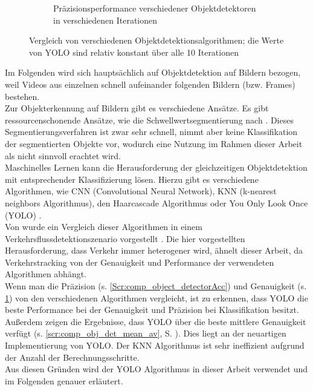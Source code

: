 \begin{figure}[ht]
\begin{subfigure}[b]{0.45\textwidth}
		\caption{Präzisionsperformance verschiedener Objektdetektoren in verschiedenen Iterationen  \cite{Pavani2022}}
		\label{Scr:comp_object_detectorPrec}
	\end{subfigure} 
	\caption[Vergleich von verschiedenen Objektdetektionsalgorithmen]{Vergleich von verschiedenen Objektdetektionsalgorithmen; die Werte von YOLO sind relativ konstant über alle 10 Iterationen \cite{Pavani2022}}
	\label{Scr:comp_object_detector}
\end{figure}
{Im Folgenden wird sich hauptsächlich auf Objektdetektion auf Bildern bezogen, weil Videos aus einzelnen schnell aufeinander folgenden Bildern (bzw. Frames) bestehen. \\
Zur Objekterkennung auf Bildern gibt es verschiedene Ansätze. Es gibt ressourcenschonende Ansätze, wie die Schwellwertsegmentierung nach \citeauthor{Otsu1979} \cite{Otsu1979}. Dieses Segmentierungsverfahren ist zwar sehr schnell, nimmt aber keine Klassifikation der segmentierten Objekte vor, wodurch eine Nutzung im Rahmen dieser Arbeit als nicht sinnvoll erachtet wird. \\
Maschinelles Lernen kann die Herausforderung der gleichzeitigen Objektdetektion mit entsprechender Klassifizierung lösen. Hierzu gibt es verschiedene Algorithmen, wie CNN (\glqq Convolutional Neural Network\grqq{}), KNN (\glqq k-nearest neighbors\grqq{} Algorithmus), den Haarcascade Algorithmus oder \glqq You Only Look Once\grqq{} (YOLO) 
\cite{Pavani2022}. \\
Von \citeauthor{Pavani2022} \cite{Pavani2022} wurde ein Vergleich dieser Algorithmen in einem  Verkehrsflussdetektionszenario vorgestellt \citep{Pavani2022}. Die hier vorgestellten Herausforderung, dass Verkehr immer heterogener wird, ähnelt dieser Arbeit, da Verkehrstracking von der Genauigkeit und Performance der verwendeten Algorithmen abhängt.\\
Wenn man die Präzision (s. \ref{Scr:comp_object_detectorAcc}) und Genauigkeit (s. \ref{Scr:comp_object_detectorPrec}) von den verschiedenen Algorithmen vergleicht, ist zu erkennen, dass YOLO die beste Performance bei der Genauigkeit und Präzision bei Klassifikation besitzt. Außerdem zeigen die Ergebnisse, dass YOLO über die beste mittlere Genauigkeit verfügt (s. \ref{scr:comp_obj_det_mean_av}, S. \pageref{scr:comp_obj_det_mean_av}). Dies liegt an der neuartigen Implementierung von YOLO. Der KNN Algorithmus ist sehr ineffizient aufgrund der Anzahl der Berechnungsschritte.\\
Aus diesen Gründen wird der YOLO Algorithmus in dieser Arbeit verwendet und im Folgenden genauer erläutert.

 }


